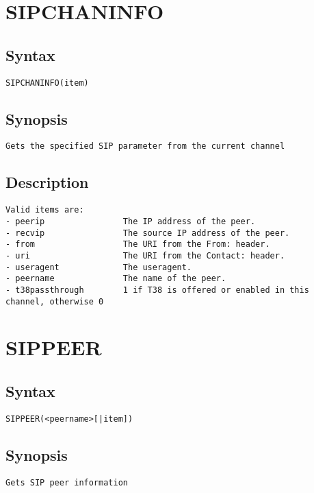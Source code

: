 \section{SIPCHANINFO}
\subsection{Syntax}
\begin{verbatim}
SIPCHANINFO(item)
\end{verbatim}
\subsection{Synopsis}
\begin{verbatim}
Gets the specified SIP parameter from the current channel
\end{verbatim}
\subsection{Description}
\begin{verbatim}
Valid items are:
- peerip                The IP address of the peer.
- recvip                The source IP address of the peer.
- from                  The URI from the From: header.
- uri                   The URI from the Contact: header.
- useragent             The useragent.
- peername              The name of the peer.
- t38passthrough        1 if T38 is offered or enabled in this channel, otherwise 0

\end{verbatim}


\section{SIPPEER}
\subsection{Syntax}
\begin{verbatim}
SIPPEER(<peername>[|item])
\end{verbatim}
\subsection{Synopsis}
\begin{verbatim}
Gets SIP peer information
\end{verbatim}
